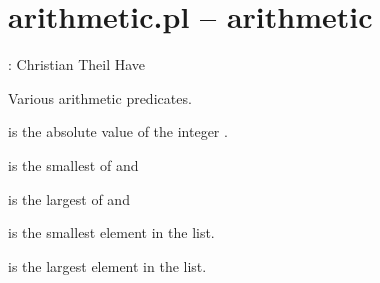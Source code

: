 


\section{arithmetic.pl -- arithmetic}

\label{sec:arithmetic}

\begin{tags}
: Christian Theil Have
\end{tags}

Various arithmetic predicates.\vspace{0.7cm}

\begin{description}
 is the absolute value of the integer .

 is the smallest of  and 

 is the largest of  and 

 is the smallest element in the list.

 is the largest element in the list.
\end{description}

